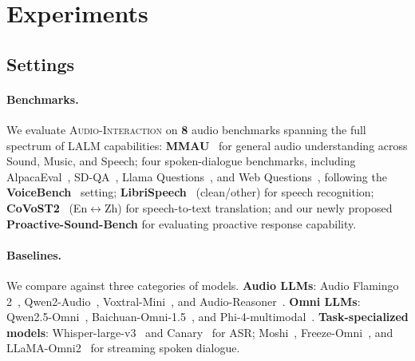 \documentclass{llmxive}
\begin{document}



\vspace{-2mm}
\section{Experiments}
\label{sec:experiments}
 \vspace{-2mm}
 
\subsection{Settings}
\label{sec:settings}
\vspace{-2mm}

\paragraph{Benchmarks.}
We evaluate \textsc{Audio-Interaction} on \textbf{8} audio benchmarks spanning the full spectrum of LALM capabilities: \textbf{MMAU}~\citep{sakshi2024mmau} for general audio understanding across Sound, Music, and Speech; four spoken-dialogue benchmarks, including AlpacaEval~\citep{dubois2023alpacafarm}, SD-QA~\citep{faisal2021sd}, Llama Questions~\citep{nachmani2023spoken}, and Web Questions~\citep{berant2013semantic}, following the \textbf{VoiceBench}~\citep{chen2026voicebench} setting; \textbf{LibriSpeech}~\citep{panayotov2015librispeech} (clean/other) for speech recognition; \textbf{CoVoST2}~\citep{wang2021covost} (En$\leftrightarrow$Zh) for speech-to-text translation; and our newly proposed \textbf{Proactive-Sound-Bench} for evaluating proactive response capability.

\vspace{-2mm}
\paragraph{Baselines.}
We compare against three categories of models. \textbf{Audio LLMs}: Audio Flamingo 2~\citep{ghosh2025audio}, Qwen2-Audio~\citep{chu2024qwen2}, Voxtral-Mini~\citep{liu2025voxtral}, and Audio-Reasoner~\citep{audio-reasoner}. \textbf{Omni LLMs}: Qwen2.5-Omni~\citep{qwen25omni2025}, Baichuan-Omni-1.5~\citep{li2025baichuan}, and Phi-4-multimodal~\citep{abouelenin2025phi}. \textbf{Task-specialized models}: Whisper-large-v3~\citep{radford2023whisper} and Canary~\citep{sekoyan2025canary} for ASR; Moshi~\citep{defossez2024moshi}, Freeze-Omni~\citep{wang2024freeze}, and LLaMA-Omni2~\citep{fang2025llama} for streaming spoken dialogue. 
\end{document}
